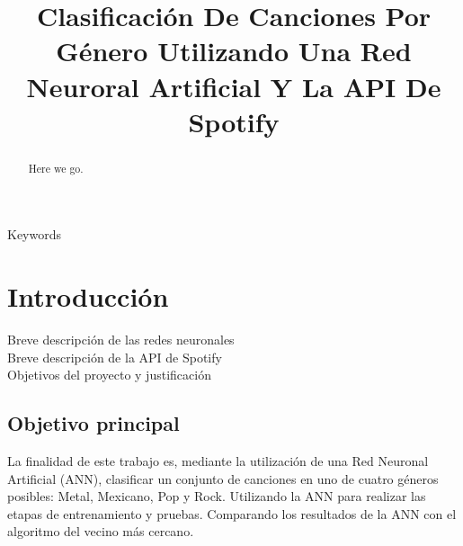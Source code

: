 \documentclass[conference]{IEEEtran}
\begin{document}
\title{  Clasificación De Canciones Por Género Utilizando Una Red Neuroral Artificial Y La API De Spotify }
\author{

\and
{}
}

\maketitle
\renewcommand\abstractname{Abstract}
\begin{abstract}
Here we go. \\
\end{abstract}

\begin{IEEEkeywords}
Keywords
\end{IEEEkeywords}

\IEEEpeerreviewmaketitle
\section{Introducci\'on}

Breve descripción de las redes neuronales\\

Breve descripción de la API de Spotify \\

Objetivos del proyecto y justificación \\
\subsection{Objetivo principal}
La finalidad de este trabajo es, mediante la utilización de una Red Neuronal Artificial (ANN), clasificar un conjunto de canciones en uno de cuatro géneros posibles: Metal, Mexicano, Pop y Rock. Utilizando la ANN para realizar las etapas de entrenamiento y pruebas. Comparando los resultados de la ANN con el algoritmo del vecino más cercano.\\
\end{document}

